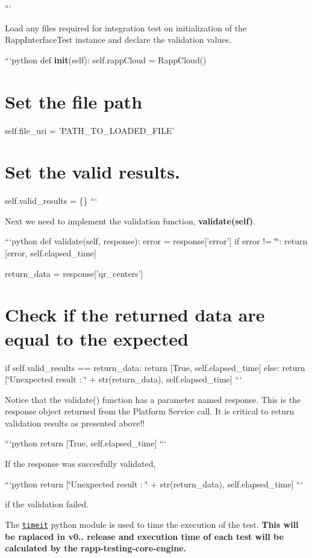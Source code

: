```

Load any files required for integration test on initialization of the Rapp\-Interface\-Test instance and declare the validation values.

```python def {\bfseries init}(self)\-: self.\-rapp\-Cloud = Rapp\-Cloud()

\section*{Set the file path}

self.\-file\-\_\-uri = 'P\-A\-T\-H\-\_\-\-T\-O\-\_\-\-L\-O\-A\-D\-E\-D\-\_\-\-F\-I\-L\-E' \section*{Set the valid results.}

self.\-valid\-\_\-results = \{\} ```

Next we need to implement the validation function, {\bfseries validate(self)}.

```python def validate(self, response)\-: error = response\mbox{[}'error'\mbox{]} if error != \char`\"{}\char`\"{}\-: return \mbox{[}error, self.\-elapsed\-\_\-time\mbox{]}

return\-\_\-data = response\mbox{[}'qr\-\_\-centers'\mbox{]} \section*{Check if the returned data are equal to the expected}

if self.\-valid\-\_\-results == return\-\_\-data\-: return \mbox{[}True, self.\-elapsed\-\_\-time\mbox{]} else\-: return \mbox{[}\char`\"{}\-Unexpected result \-: \char`\"{} + str(return\-\_\-data), self.\-elapsed\-\_\-time\mbox{]} ```

Notice that the validate() function has a parameter named response. This is the response object returned from the Platform Service call. It is critical to return validation results as presented above!!

```python return \mbox{[}True, self.\-elapsed\-\_\-time\mbox{]} ```

If the response was succesfully validated,

```python return \mbox{[}\char`\"{}\-Unexpected result \-: \char`\"{} + str(return\-\_\-data), self.\-elapsed\-\_\-time\mbox{]} ```

if the validation failed.

The \href{https://docs.python.org/2/library/timeit.html}{\tt timeit} python module is used to time the execution of the test. {\bfseries This will be raplaced in v0.. release and execution time of each test will be calculated by the rapp-\/testing-\/core-\/engine.}

